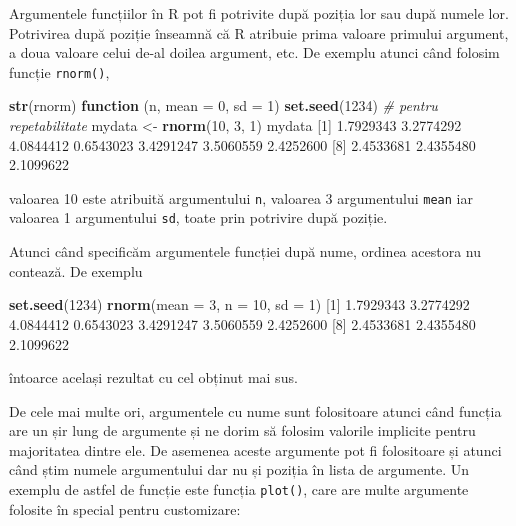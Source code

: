 \documentclass[]{article}
\newenvironment{Shaded}{\begin{snugshade}}{\end{snugshade}}
\newcommand{\KeywordTok}[1]{\textcolor[rgb]{0.13,0.29,0.53}{\textbf{#1}}}
\newcommand{\DataTypeTok}[1]{\textcolor[rgb]{0.13,0.29,0.53}{#1}}
\newcommand{\DecValTok}[1]{\textcolor[rgb]{0.00,0.00,0.81}{#1}}
\newcommand{\FloatTok}[1]{\textcolor[rgb]{0.00,0.00,0.81}{#1}}
\newcommand{\StringTok}[1]{\textcolor[rgb]{0.31,0.60,0.02}{#1}}
\newcommand{\CommentTok}[1]{\textcolor[rgb]{0.56,0.35,0.01}{\textit{#1}}}
\newcommand{\ControlFlowTok}[1]{\textcolor[rgb]{0.13,0.29,0.53}{\textbf{#1}}}
\newcommand{\NormalTok}[1]{#1}
\begin{document}
Argumentele funcțiilor în R pot fi potrivite după poziția lor sau după
numele lor. Potrivirea după poziție înseamnă că R atribuie prima valoare
primului argument, a doua valoare celui de-al doilea argument, etc. De
exemplu atunci când folosim funcție \texttt{rnorm()},

\begin{Shaded}
\begin{Highlighting}[]
\KeywordTok{str}\NormalTok{(rnorm)}
\ControlFlowTok{function}\NormalTok{ (n, }\DataTypeTok{mean =} \DecValTok{0}\NormalTok{, }\DataTypeTok{sd =} \DecValTok{1}\NormalTok{)  }
\KeywordTok{set.seed}\NormalTok{(}\DecValTok{1234}\NormalTok{) }\CommentTok{# pentru repetabilitate}
\NormalTok{mydata <-}\StringTok{ }\KeywordTok{rnorm}\NormalTok{(}\DecValTok{10}\NormalTok{, }\DecValTok{3}\NormalTok{, }\DecValTok{1}\NormalTok{) }
\NormalTok{mydata}
\NormalTok{ [}\DecValTok{1}\NormalTok{] }\FloatTok{1.7929343} \FloatTok{3.2774292} \FloatTok{4.0844412} \FloatTok{0.6543023} \FloatTok{3.4291247} \FloatTok{3.5060559} \FloatTok{2.4252600}
\NormalTok{ [}\DecValTok{8}\NormalTok{] }\FloatTok{2.4533681} \FloatTok{2.4355480} \FloatTok{2.1099622}
\end{Highlighting}
\end{Shaded}

valoarea 10 este atribuită argumentului \texttt{n}, valoarea 3
argumentului \texttt{mean} iar valoarea 1 argumentului \texttt{sd},
toate prin potrivire după poziție.

Atunci când specificăm argumentele funcției după nume, ordinea acestora
nu contează. De exemplu

\begin{Shaded}
\begin{Highlighting}[]
\KeywordTok{set.seed}\NormalTok{(}\DecValTok{1234}\NormalTok{)}
\KeywordTok{rnorm}\NormalTok{(}\DataTypeTok{mean =} \DecValTok{3}\NormalTok{, }\DataTypeTok{n =} \DecValTok{10}\NormalTok{, }\DataTypeTok{sd =} \DecValTok{1}\NormalTok{)}
\NormalTok{ [}\DecValTok{1}\NormalTok{] }\FloatTok{1.7929343} \FloatTok{3.2774292} \FloatTok{4.0844412} \FloatTok{0.6543023} \FloatTok{3.4291247} \FloatTok{3.5060559} \FloatTok{2.4252600}
\NormalTok{ [}\DecValTok{8}\NormalTok{] }\FloatTok{2.4533681} \FloatTok{2.4355480} \FloatTok{2.1099622}
\end{Highlighting}
\end{Shaded}

întoarce același rezultat cu cel obținut mai sus.

De cele mai multe ori, argumentele cu nume sunt folositoare atunci când
funcția are un șir lung de argumente și ne dorim să folosim valorile
implicite pentru majoritatea dintre ele. De asemenea aceste argumente
pot fi folositoare și atunci când știm numele argumentului dar nu și
poziția în lista de argumente. Un exemplu de astfel de funcție este
funcția \texttt{plot()}, care are multe argumente folosite în special
pentru customizare:
\end{document}
